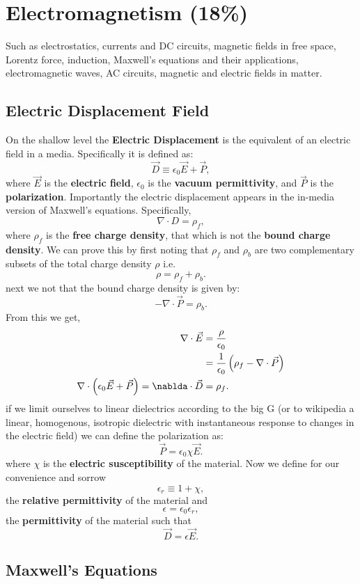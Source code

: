 \documentclass[%
 reprint,
superscriptaddress,
 amsmath,amssymb,
 aps,
prc,
]{revtex4-1}
\begin{document}
\section{Electromagnetism (18\%)}
Such as electrostatics, currents and DC circuits, magnetic fields in free space, Lorentz force, induction, Maxwell's equations and their applications, 
electromagnetic waves, AC circuits, magnetic and electric fields in matter.
\subsection{Electric Displacement Field}
On the shallow level the \textbf{Electric Displacement} is the equivalent of an electric field in a media. Specifically it is defined as:
$$\vec{D}\equiv \epsilon_0 \vec{E}+\vec{P}, $$
where $\vec{E}$ is the \textbf{electric field}, $\epsilon_0$ is the \textbf{vacuum permittivity}, and $\vec{P}$ is the \textbf{polarization}. Importantly 
the electric displacement appears in the in-media version of Maxwell's equations. Specifically,
$$\nabla \cdot D = \rho_f,$$
where $\rho_f$ is the \textbf{free charge density}, that which is not the \textbf{bound charge density}. We can prove this by first noting that $\rho_f$ and 
$\rho_b$ are two complementary subsets of the total charge density $\rho$ i.e.
$$\rho=\rho_f+ \rho_b.$$
next we not that the bound charge density is given by:
$$-\nabla\cdot\vec{P}=\rho_b.  $$
From this we get,
\begin{align*}
\nabla \cdot \vec{E} &=\dfrac{\rho}{\epsilon_0}\\
&=\dfrac{1}{\epsilon_0}\left(\rho_f-\nabla\cdot\vec{P}\right)\\
\nabla\cdot\left(\epsilon_0\vec{E}+\vec{P}\right)=\nablda\cdot\vec{D}&=\rho_f.
\end{align*}
if we limit ourselves to linear dielectrics according to the big G (or to wikipedia a linear, homogenous, isotropic dielectric with instantaneous response 
to changes in the electric field) we can define the polarization as:
$$\vec{P}=\epsilon_0\chi\vec{E}.$$
where $\chi$ is the \textbf{electric susceptibility} of the material. Now we define for our convenience and sorrow
$$\epsilon_r\equiv 1+\chi,$$
the \textbf{relative permittivity} of the material and
$$\epsilon=\epsilon_0\epsilon_r,$$
the \textbf{permittivity} of the material such that
$$\vec{D}=\epsilon\vec{E}.$$


\subsection{Maxwell's Equations}
\end{document}

